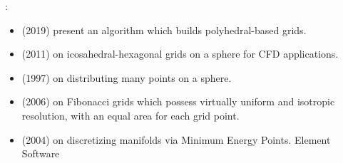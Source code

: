 \Literature: 
\begin{itemize}
\item \textcite{phdo19} (2019) present an algorithm which builds 
polyhedral-based grids.
\item \textcite{upsm11} (2011) on icosahedral-hexagonal grids on 
a sphere for CFD applications.
\item \textcite{saku97} (1997) on distributing many points on a sphere.
\item \textcite{swpu06} (2006) on Fibonacci grids which possess virtually 
uniform and isotropic resolution, with an equal area for each grid point.
\item \textcite{hasa04} (2004) on discretizing manifolds via Minimum Energy Points.
Element Software
\end{itemize}


